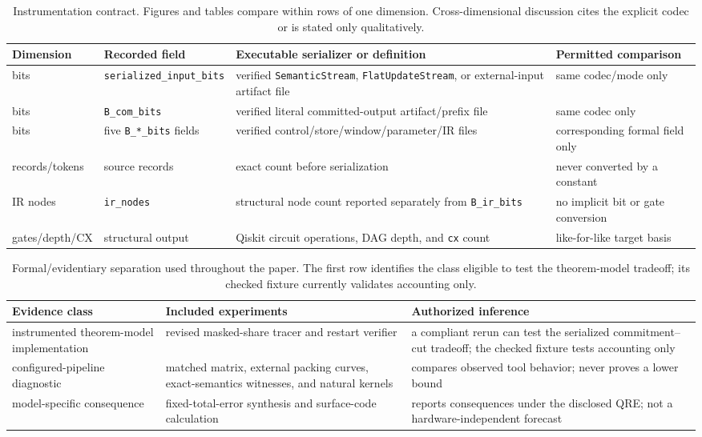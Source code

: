 \documentclass[aps,prx,reprint,floatfix,superscriptaddress]{revtex4-2}
\begin{document}
\begin{table}[!t]
\centering
\scriptsize
\setlength{\tabcolsep}{3pt}
\begin{tabularx}{\textwidth}{@{}l l X X@{}}
\toprule
Dimension & Recorded field & Executable serializer or definition & Permitted comparison \\
\midrule
bits & \texttt{serialized\_input\_bits} & verified \texttt{SemanticStream}, \texttt{FlatUpdateStream}, or external-input artifact file & same codec/mode only \\
bits & \texttt{B\_com\_bits} & verified literal committed-output artifact/prefix file & same codec only \\
bits & five \texttt{B\_*\_bits} fields & verified control/store/window/parameter/IR files & corresponding formal field only \\
records/tokens & source records & exact count before serialization & never converted by a constant \\
IR nodes & \texttt{ir\_nodes} & structural node count reported separately from \texttt{B\_ir\_bits} & no implicit bit or gate conversion \\
gates/depth/CX & structural output & Qiskit circuit operations, DAG depth, and \texttt{cx} count & like-for-like target basis \\
\bottomrule
\end{tabularx}
\caption{Instrumentation contract.  Figures and tables compare within rows of
one dimension.  Cross-dimensional discussion cites the explicit codec or is
stated only qualitatively.}
\label{tab:instrumentation-contract}
\end{table}

\begin{table}[!t]
\centering
\small
\setlength{\tabcolsep}{4pt}
\begin{tabularx}{\textwidth}{@{}l X X@{}}
\toprule
Evidence class & Included experiments & Authorized inference \\
\midrule
instrumented theorem-model implementation & revised masked-share tracer and restart verifier & a compliant rerun can test the serialized commitment--cut tradeoff; the checked fixture tests accounting only \\
configured-pipeline diagnostic & matched matrix, external packing curves, exact-semantics witnesses, and natural kernels & compares observed tool behavior; never proves a lower bound \\
model-specific consequence & fixed-total-error synthesis and surface-code calculation & reports consequences under the disclosed QRE; not a hardware-independent forecast \\
\bottomrule
\end{tabularx}
\caption{Formal/evidentiary separation used throughout the paper.  The first
row identifies the class eligible to test the theorem-model tradeoff; its
checked fixture currently validates accounting only.}
\label{tab:evidence-classes}
\end{table}
\end{document}
